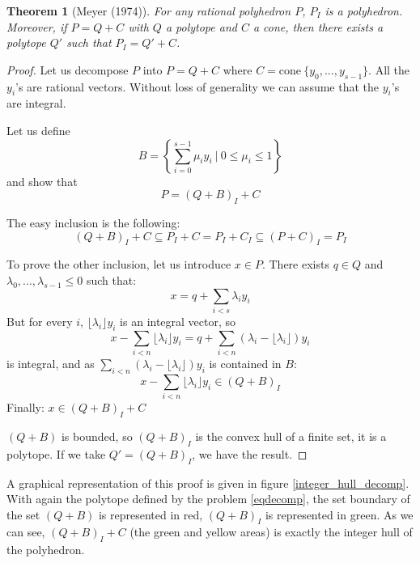\documentclass{article}
\newcommand{\cone}{\mathrm{cone}}
\newtheorem{theorem}{Theorem}
\begin{document}
\begin{theorem}[Meyer (1974)]
\label{meyer theorem}
  For any rational polyhedron $P$, $P_I$ is a polyhedron. Moreover, if
  $P = Q + C$ with $Q$ a polytope and $C$ a cone, then there exists a polytope
  $Q'$ such that $P_I = Q' + C$.
\end{theorem}
\begin{proof}
  Let us decompose $P$ into $P = Q + C$ where
  $C = \cone~\{y_0, ..., y_{s-1}\}$. All the $y_i$'s are rational vectors.
  Without loss of generality we can assume that the $y_i$'s are integral.

  Let us define
  $$B = \left\{\sum_{i=0}^{s-1} \mu_i y_i~|~
               0 \leqslant \mu_i \leqslant 1\right\}$$
  and show that $$P = (Q + B)_I + C$$

  The easy inclusion is the following:
  $$(Q + B)_I + C \subseteq P_I + C = P_I + C_I \subseteq (P + C)_I = P_I$$

  To prove the other inclusion, let us introduce $x \in P$.
  There exists $q \in Q$ and $\lambda_0, ..., \lambda_{s-1}
  \leqslant 0$ such that: $$x = q + \sum_{i < s} \lambda_i y_i$$ But for every
  $i$, $\lfloor \lambda_i \rfloor y_i$ is an integral vector, so
  $$x - \sum_{i<n} \lfloor \lambda_i \rfloor y_i=
      q + \sum_{i<n} (\lambda_i - \lfloor \lambda_i \rfloor) y_i$$
  is integral, and as $\sum_{i<n} (\lambda_i - \lfloor \lambda_i \rfloor) y_i$
  is contained in $B$:
  $$x - \sum_{i<n} \lfloor \lambda_i \rfloor y_i \in (Q + B)_I$$
  Finally: $x \in (Q + B)_I + C$

  $(Q + B)$ is bounded, so $(Q + B)_I$ is the convex hull of a finite set, it is
  a polytope. If we take $Q' = (Q + B)_I$, we have the result.
\end{proof}

A graphical representation of this proof is given in figure
\ref{integer_hull_decomp}. With again the polytope defined by the problem
\ref{eqdecomp}, the set boundary of the set $(Q + B)$ is represented
in red, $(Q + B)_I$ is represented in green. As we can see, $(Q + B)_I + C$ (the
green and yellow areas) is exactly the integer hull of the polyhedron.
\end{document}
